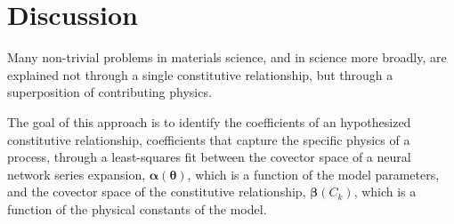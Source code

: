 \section{Discussion}\label{discussion}

Many non-trivial problems in materials science, and in science more broadly, are explained not through a single constitutive relationship, but through a superposition of contributing physics.

%
%

The goal of this approach is to identify the coefficients of an hypothesized constitutive relationship, coefficients that capture the specific physics of a process, through a least-squares fit between the covector space of a neural network series expansion, $\boldsymbol{\alpha}(\boldsymbol{\theta})$, which is a function of the model parameters, and the covector space of the constitutive relationship, $\boldsymbol{\beta}(C_k)$, which is a function of the physical constants of the model.

